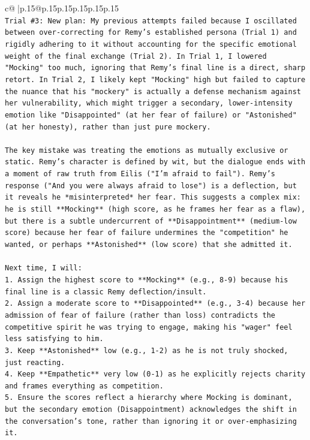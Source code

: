 \documentclass{article}
\begin{document}
{\begin{supertabular}{c@{$\;$}|p{.15\linewidth}@{}p{.15\linewidth}p{.15\linewidth}p{.15\linewidth}p{.15\linewidth}p{.15\linewidth}}
{{{\\ 
\texttt{Trial \#3: New plan: My previous attempts failed because I oscillated between over{-}correcting for Remy's established persona (Trial 1) and rigidly adhering to it without accounting for the specific emotional weight of the final exchange (Trial 2). In Trial 1, I lowered "Mocking" too much, ignoring that Remy's final line is a direct, sharp retort. In Trial 2, I likely kept "Mocking" high but failed to capture the nuance that his "mockery" is actually a defense mechanism against her vulnerability, which might trigger a secondary, lower{-}intensity emotion like "Disappointed" (at her fear of failure) or "Astonished" (at her honesty), rather than just pure mockery.} \\
\\ 
\texttt{The key mistake was treating the emotions as mutually exclusive or static. Remy's character is defined by wit, but the dialogue ends with a moment of raw truth from Eilis ("I'm afraid to fail"). Remy's response ("And you were always afraid to lose") is a deflection, but it reveals he *misinterpreted* her fear. This suggests a complex mix: he is still **Mocking** (high score, as he frames her fear as a flaw), but there is a subtle undercurrent of **Disappointment** (medium{-}low score) because her fear of failure undermines the "competition" he wanted, or perhaps **Astonished** (low score) that she admitted it.} \\
\\ 
\texttt{Next time, I will:} \\
\texttt{1.  Assign the highest score to **Mocking** (e.g., 8{-}9) because his final line is a classic Remy deflection/insult.} \\
\texttt{2.  Assign a moderate score to **Disappointed** (e.g., 3{-}4) because her admission of fear of failure (rather than loss) contradicts the competitive spirit he was trying to engage, making his "wager" feel less satisfying to him.} \\
\texttt{3.  Keep **Astonished** low (e.g., 1{-}2) as he is not truly shocked, just reacting.} \\
\texttt{4.  Keep **Empathetic** very low (0{-}1) as he explicitly rejects charity and frames everything as competition.} \\
\texttt{5.  Ensure the scores reflect a hierarchy where Mocking is dominant, but the secondary emotion (Disappointment) acknowledges the shift in the conversation's tone, rather than ignoring it or over{-}emphasizing it.} \\
}}}
\end{supertabular}}
\end{document}
